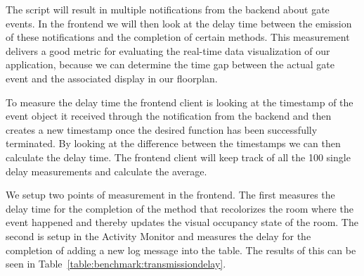 The script will result in multiple notifications from the backend about gate events. In the frontend we will then look at the delay time between the emission of these notifications  and the completion of certain methods. This measurement delivers a good metric for evaluating the real-time data visualization of our application, because we can determine the time gap between the actual gate event and the associated display in our floorplan.

To measure the delay time the frontend client is looking at the timestamp of the event object it received through the notification from the backend and then creates a new timestamp once the desired function has been successfully terminated. By looking at the difference between the timestamps we can then calculate the delay time. The frontend client will keep track of all the 100 single delay measurements and calculate the average. 

We setup two points of measurement in the frontend. The first measures the delay time for the completion of the method that recolorizes the room where the event happened and thereby updates the visual occupancy state of the room. The second is setup in the Activity Monitor and measures the delay for the completion of adding a new log message into the table.
The results of this can be seen in Table~\ref{table:benchmark:transmissiondelay}.


